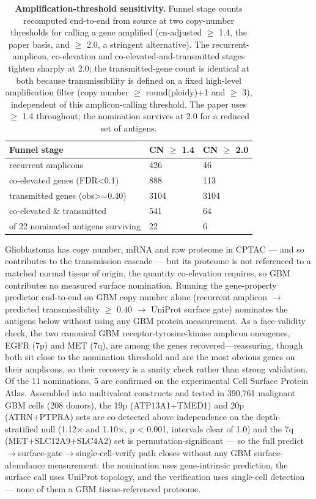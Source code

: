 \documentclass[times, twoside]{zHenriquesLab-StyleBioRxiv}
\begin{document}
\begin{table}[tbp]
\centering
{\footnotesize
\begin{tabular}{@{}lll@{}}
\toprule
\textbf{Funnel stage} & \textbf{CN $\geq$ 1.4} & \textbf{CN $\geq$ 2.0} \\
\midrule
recurrent amplicons & 426 & 46 \\
co-elevated genes (FDR<0.1) & 888 & 113 \\
transmitted genes (obs>=0.40) & 3104 & 3104 \\
co-elevated \& transmitted & 541 & 64 \\
of 22 nominated antigens surviving & 22 & 6 \\
\bottomrule
\end{tabular}
}
\caption{\textbf{Amplification-threshold sensitivity.} Funnel stage counts recomputed end-to-end from source at two copy-number thresholds for calling a gene amplified (cn-adjusted $\geq$ 1.4, the paper basis, and $\geq$ 2.0, a stringent alternative). The recurrent-amplicon, co-elevation and co-elevated-and-transmitted stages tighten sharply at 2.0; the transmitted-gene count is identical at both because transmissibility is defined on a fixed high-level amplification filter (copy number $\geq$ round(ploidy)+1 and $\geq$ 3), independent of this amplicon-calling threshold. The paper uses $\geq$ 1.4 throughout; the nomination survives at 2.0 for a reduced set of antigens.}
\label{tab:threshold}
\end{table}
Glioblastoma has copy number, mRNA and raw proteome in CPTAC --- and so contributes to the transmission cascade --- but its proteome is not referenced to a matched normal tissue of origin, the quantity co-elevation requires, so GBM contributes no measured surface nomination. Running the gene-property predictor end-to-end on GBM copy number alone (recurrent amplicon $\rightarrow$ predicted transmissibility $\geq$ 0.40 $\rightarrow$ UniProt surface gate) nominates the antigens below without using any GBM protein measurement. As a face-validity check, the two canonical GBM receptor-tyrosine-kinase amplicon oncogenes, EGFR (7p) and MET (7q), are among the genes recovered---reassuring, though both sit close to the nomination threshold and are the most obvious genes on their amplicons, so their recovery is a sanity check rather than strong validation. Of the 11 nominations, 5 are confirmed on the experimental Cell Surface Protein Atlas. Assembled into multivalent constructs and tested in 390,761 malignant GBM cells (208 donors), the 19p (ATP13A1+TMED1) and 20p (ATRN+PTPRA) sets are co-detected above independence on the depth-stratified null (1.12$\times$ and 1.10$\times$, p < 0.001, intervals clear of 1.0) and the 7q (MET+SLC12A9+SLC4A2) set is permutation-significant --- so the full predict$\rightarrow$surface-gate$\rightarrow$single-cell-verify path closes without any GBM surface-abundance measurement: the nomination uses gene-intrinsic prediction, the surface call uses UniProt topology, and the verification uses single-cell detection --- none of them a GBM tissue-referenced proteome.
\end{document}
